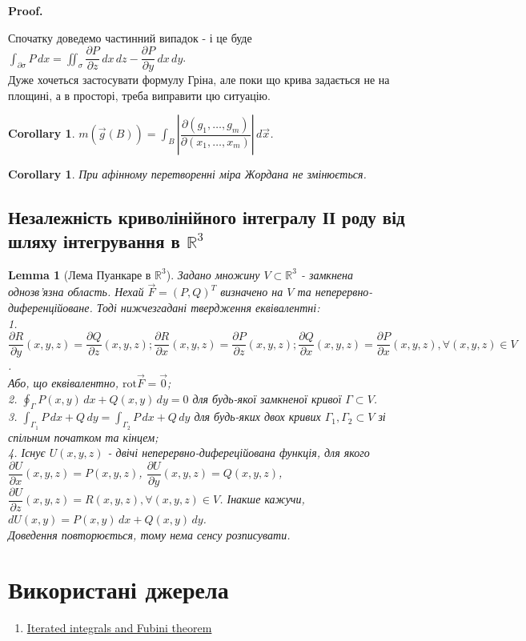 \documentclass[a4paper, 10pt]{article}
\makeatletter
\def\departial#1#2{\dfrac{\partial {#1}}{\partial {#2}}}
\def\qed{$\blacksquare$}
\theoremstyle{theoremdd}
\theoremstyle{theoremdd}
\theoremstyle{theoremdd}
\theoremstyle{theoremdd}
\theoremstyle{theoremdd}
\theoremstyle{theoremdd}
\theoremstyle{theoremdd}
\theoremstyle{theoremdd}
\theoremstyle{theoremdd}
\theoremstyle{theoremdd}
\theoremstyle{theoremdd}
\theoremstyle{theoremdd}
\theoremstyle{theoremdd}
\newtheorem{lemma}[theorem]{Lemma}
\theoremstyle{theoremdd}
\newtheorem{corollary}[theorem]{Corollary}
\theoremstyle{theoremdd}
\renewenvironment{proof}[1][Proof.\\]{\par
\pushQED{\hfill \qed}%
\normalfont \topsep6\p@\@plus6\p@\relax
\trivlist
\item\relax
{\bfseries
#1\@addpunct{.}}\hspace\labelsep\ignorespaces
}{%
\popQED\endtrivlist\@endpefalse
}
\makeatother
\begin{document}
\begin{proof}
Спочатку доведемо частинний випадок - і це буде $\displaystyle\int_{\partial \sigma} P\,dx = \iint_\sigma \departial{P}{z}\,dx\,dz - \departial{P}{y}\,dx\,dy$.\\
Дуже хочеться застосувати формулу Гріна, але поки що крива задається не на площині, а в просторі, треба виправити цю ситуацію.
\end{proof}

\begin{corollary}
$m(\vec{g}(B)) = \displaystyle\int_B \left| \dfrac{\partial(g_1,\dots,g_m)}{\partial(x_1,\dots,x_m)} \right|\,d\vec{x}$.
\end{corollary}

\begin{corollary}
При афінному перетворенні міра Жордана не змінюється.
\end{corollary}

\subsection{Незалежність криволінійного інтегралу ІІ роду від шляху інтегрування в $\mathbb{R}^3$}
\begin{lemma}[Лема Пуанкаре в $\mathbb{R}^3$]
Задано множину $V \subset \mathbb{R}^3$ - замкнена однозв'язна область. Нехай $\vec{F} = (P,Q)^T$ визначено на $V$ та неперервно-диференційоване. Тоді нижчезгадані твердження еквівалентні:\\
1. $\departial{R}{y}(x,y,z) = \departial{Q}{z}(x,y,z); \departial{R}{x}(x,y,z) = \departial{P}{z}(x,y,z); \departial{Q}{x}(x,y,z) = \departial{P}{x}(x,y,z), \forall (x,y,z) \in V$.\\
Або, що еквівалентно, $\text{rot} \vec{F} = \vec{0}$;\\
2. $\displaystyle\oint_{\Gamma} P(x,y)\,dx + Q(x,y)\,dy = 0$ для будь-якої замкненої кривої $\Gamma \subset V$.\\
3. $\displaystyle\int_{\Gamma_1} P\,dx + Q\,dy = \int_{\Gamma_2} P\,dx + Q\,dy$ для будь-яких двох кривих $\Gamma_1, \Gamma_2 \subset V$ зі спільним початком та кінцем;\\
4. Існує $U(x,y,z)$ - двічі неперервно-дифереційована функція, для якого $\departial{U}{x}(x,y,z) = P(x,y,z)$, $\departial{U}{y}(x,y,z) = Q(x,y,z)$, $\departial{U}{z}(x,y,z) = R(x,y,z), \forall (x,y,z) \in V$. Інакше кажучи,\\ $dU(x,y) =  P(x,y)\,dx + Q(x,y)\,dy$.\\
\textit{Доведення повторюється, тому нема сенсу розписувати.}
\end{lemma}
\newpage

\section*{Використані джерела}
\begin{enumerate}
\item \href{https://www.jirka.org/ra/html/sec_iteratedints.html#fig_fubinibad}{Iterated integrals and Fubini theorem}
\end{enumerate}
\end{document}
